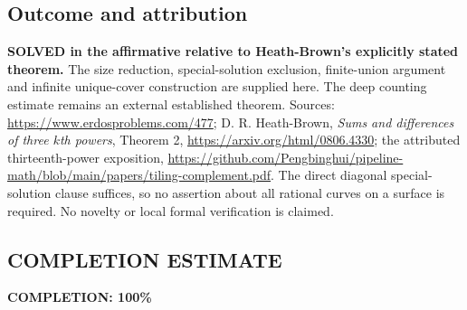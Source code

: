 \subsection*{Outcome and attribution}
\textbf{SOLVED in the affirmative relative to Heath-Brown's explicitly stated theorem.} The size reduction, special-solution exclusion, finite-union argument and infinite unique-cover construction are supplied here. The deep counting estimate remains an external established theorem.
Sources: \url{https://www.erdosproblems.com/477}; D. R. Heath-Brown, \emph{Sums and differences of three $k$th powers}, Theorem 2, \url{https://arxiv.org/html/0806.4330}; the attributed thirteenth-power exposition, \url{https://github.com/Pengbinghui/pipeline-math/blob/main/papers/tiling-complement.pdf}. The direct diagonal special-solution clause suffices, so no assertion about all rational curves on a surface is required. No novelty or local formal verification is claimed.

\subsection*{COMPLETION ESTIMATE}
\textbf{COMPLETION: 100\%}

